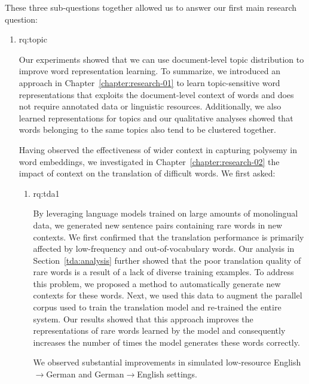 These three sub-questions together allowed us to answer our first main research question: 

\begin{enumerate}[label=\textbf{Research Question \arabic*:},ref={RQ\arabic*},wide = 0pt]
\setlength\itemsep{1em}

\item \acl{rq:topic} 

\medskip

 \noindent 
 Our experiments showed that we can use document-level topic distribution to improve word representation learning.
To summarize, we introduced an approach in Chapter~\ref{chapter:research-01} to learn topic-sensitive word representations that exploits the document-level context of words and does not require annotated data or linguistic resources. 
Additionally, we also learned representations for topics and our qualitative analyses showed that words belonging to the same topics also tend to be clustered together.

Having observed the effectiveness of wider context in capturing polysemy in word embeddings, we investigated in Chapter~\ref{chapter:research-02} the impact of context on the translation of difficult words. 
We first asked:

\begin{enumerate}[label=\textbf{RQ2.\arabic* },wide = 0pt, leftmargin=2em]
\setlength\itemsep{1em}
\item \acl{rq:tda1} \label{rq:tda1}

\medskip

\noindent 
By leveraging language models trained on large amounts of monolingual data, we generated new sentence pairs containing rare words in new contexts. 
We first confirmed that the translation performance is primarily affected by low-frequency and out-of-vocabulary words. 
Our analysis in Section~\ref{tda:analysis} further showed that the poor translation quality of rare words is a result of a lack of diverse training examples. 
To address this problem, we proposed a method to automatically generate new contexts for these words.
Next, we used this data to augment the parallel corpus used to train the translation model and re-trained the entire system. 
Our results showed that this approach improves the representations of rare words learned by the model and consequently increases the number of times the model generates these words correctly. 

We observed substantial improvements in simulated low-resource English$\rightarrow$German and German$\rightarrow$English settings.


\end{enumerate}
\end{enumerate}
